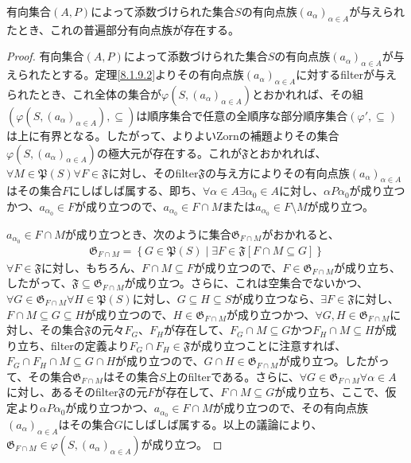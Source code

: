 \documentclass[dvipdfmx]{jsarticle}
\begin{document}
\begin{thm}\label{8.1.9.3}
有向集合$(A,P)$によって添数づけられた集合$S$の有向点族$\left( a_{\alpha} \right)_{\alpha \in A}$が与えられたとき、これの普遍部分有向点族が存在する。
\end{thm}
\begin{proof}
有向集合$(A,P)$によって添数づけられた集合$S$の有向点族$\left( a_{\alpha} \right)_{\alpha \in A}$が与えられたとする。定理\ref{8.1.9.2}よりその有向点族$\left( a_{\alpha} \right)_{\alpha \in A}$に対するfilterが与えられたとき、これ全体の集合が$\varphi\left( S,\left( a_{\alpha} \right)_{\alpha \in A} \right)$とおかれれば、その組$\left( \varphi\left( S,\left( a_{\alpha} \right)_{\alpha \in A} \right), \subseteq \right)$は順序集合で任意の全順序な部分順序集合$\left( \varphi', \subseteq \right)$は上に有界となる。したがって、よりよいZornの補題よりその集合$\varphi\left( S,\left( a_{\alpha} \right)_{\alpha \in A} \right)$の極大元が存在する。これが$\mathfrak{F}$とおかれれば、$\forall M \in \mathfrak{P}(S)\forall F \in \mathfrak{F}$に対し、そのfilter$\mathfrak{F}$の与え方によりその有向点族$\left( a_{\alpha} \right)_{\alpha \in A}$はその集合$F$にしばしば属する、即ち、$\forall\alpha \in A\exists\alpha_{0} \in A$に対し、$\alpha P\alpha_{0}$が成り立つかつ、$a_{\alpha_{0}} \in F$が成り立つので、$a_{\alpha_{0}} \in F \cap M$または$a_{\alpha_{0}} \in F \setminus M$が成り立つ。\par
$a_{\alpha_{0}} \in F \cap M$が成り立つとき、次のように集合$\mathfrak{G}_{F \cap M}$がおかれると、
\begin{align*}
\mathfrak{G}_{F \cap M} = \left\{ G \in \mathfrak{P}(S) \middle| \exists F \in \mathfrak{F}[ F \cap M \subseteq G] \right\}
\end{align*}
$\forall F \in \mathfrak{F}$に対し、もちろん、$F \cap M \subseteq F$が成り立つので、$F \in \mathfrak{G}_{F \cap M}$が成り立ち、したがって、$\mathfrak{F \subseteq}\mathfrak{G}_{F \cap M}$が成り立つ。さらに、これは空集合でないかつ、$\forall G \in \mathfrak{G}_{F \cap M}\forall H \in \mathfrak{P}(S)$に対し、$G \subseteq H \subseteq S$が成り立つなら、$\exists F \in \mathfrak{F}$に対し、$F \cap M \subseteq G \subseteq H$が成り立つので、$H \in \mathfrak{G}_{F \cap M}$が成り立つかつ、$\forall G,H \in \mathfrak{G}_{F \cap M}$に対し、その集合$\mathfrak{F}$の元々$F_{G}$、$F_{H}$が存在して、$F_{G} \cap M \subseteq G$かつ$F_{H} \cap M \subseteq H$が成り立ち、filterの定義より$F_{G} \cap F_{H}\in \mathfrak{F}$が成り立つことに注意すれば、$F_{G} \cap F_{H} \cap M \subseteq G \cap H$が成り立つので、$G \cap H \in \mathfrak{G}_{F \cap M}$が成り立つ。したがって、その集合$\mathfrak{G}_{F \cap M}$はその集合$S$上のfilterである。さらに、$\forall G \in \mathfrak{G}_{F \cap M}\forall\alpha \in A$に対し、あるそのfilter$\mathfrak{F}$の元$F$が存在して、$F \cap M \subseteq G$が成り立ち、ここで、仮定より$\alpha P\alpha_{0}$が成り立つかつ、$a_{\alpha_{0}} \in F \cap M$が成り立つので、その有向点族$\left( a_{\alpha} \right)_{\alpha \in A}$はその集合$G$にしばしば属する。以上の議論により、$\mathfrak{G}_{F \cap M} \in \varphi\left( S,\left( a_{\alpha} \right)_{\alpha \in A} \right)$が成り立つ。\par

\end{proof}
\end{document}

